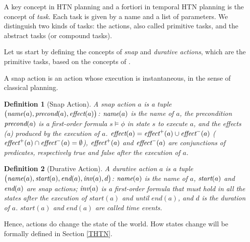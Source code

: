 \documentclass[letterpaper]{article} %
\newtheorem{definition}{Definition}
\newcommand{\name}{\text{\it name}}
\newcommand{\pre}{\text{\it precond}}
\newcommand{\effect}{\text{\it effect}}
\newcommand{\add}{\text{\it effect}^{+}}
\newcommand{\del}{\text{\it effect}^{-}}
\newcommand{\tstart}{\text{\it start}}
\newcommand{\tend}{\text{\it end}}
\newcommand{\tinv}{\text{\it inv}}
\begin{document}
 A key concept in HTN planning and a fortiori in temporal HTN planning is the concept of {\it task}. Each task is given by a name and a list of parameters. We distinguish two kinds of tasks: the actions, also called primitive tasks, and the abstract tasks (or compound tasks).


 Let us start by defining the concepts of {\it snap} and {\it durative actions}, which are the primitive tasks, based on the concepts of \cite{abdulaziz22}.

A snap action is an action whose execution is instantaneous, in the sense of classical planning. %
\begin{definition}[Snap Action] A {\em snap action} $a$ is a tuple $\bigl(\name(a), \pre(a), \effect(a) \bigr)$: $\name(a)$ is the name of $a$, the precondition $\pre(a)$ is a first-order formula $s \models \phi$ in state $s$ to execute $a$, and the effects \effect(a) produced by the execution of $a$. $\effect(a) = \add(a) \cup \del(a)$ ($\add(a) \cap \del(a) = \emptyset$), $\add(a)$ and $\del(a)$ are conjunctions of predicates, respectively true and false after the execution of $a$.
\end{definition}

\begin{definition}[Durative Action]
A {\em durative action} $a$ is a tuple $\bigl(\name(a), \tstart(a), \tend(a), \tinv(a), d\bigr)$: $\name(a)$ is the name of $a$, $\tstart(a)$ and $\tend(a)$ are snap actions; $\tinv(a)$ is a first-order formula that must hold in all the states after the execution of $start(a)$ and until $end(a)$, and $d$ is the duration of $a$. $start(a)$ and $end(a)$ are called time events.
\end{definition}
Hence, actions do change the state of the world. How states change will be formally defined in Section \ref{THTN}.
\end{document}

